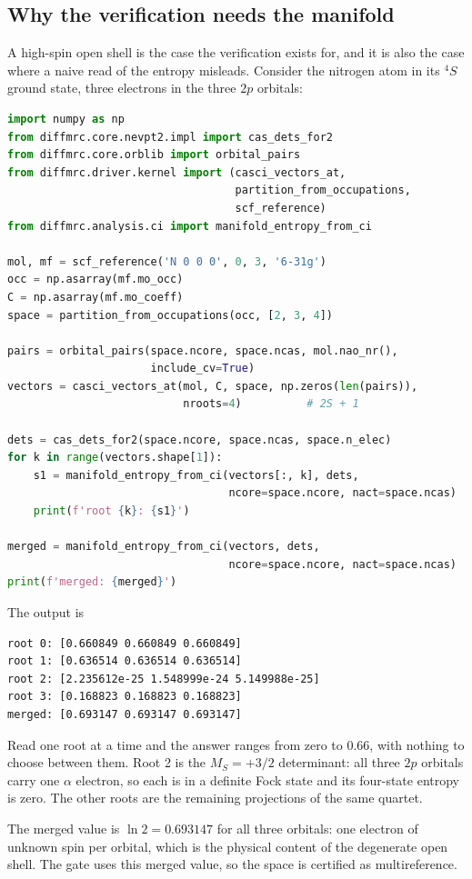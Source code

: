 \subsection{Why the verification needs the manifold}

A high-spin open shell is the case the verification exists for, and it
is also the case where a naive read of the entropy misleads.  Consider
the nitrogen atom in its $^{4}S$ ground state, three electrons in the
three $2p$ orbitals:
\begin{lstlisting}[language=Python]
import numpy as np
from diffmrc.core.nevpt2.impl import cas_dets_for2
from diffmrc.core.orblib import orbital_pairs
from diffmrc.driver.kernel import (casci_vectors_at,
                                   partition_from_occupations,
                                   scf_reference)
from diffmrc.analysis.ci import manifold_entropy_from_ci

mol, mf = scf_reference('N 0 0 0', 0, 3, '6-31g')
occ = np.asarray(mf.mo_occ)
C = np.asarray(mf.mo_coeff)
space = partition_from_occupations(occ, [2, 3, 4])

pairs = orbital_pairs(space.ncore, space.ncas, mol.nao_nr(),
                      include_cv=True)
vectors = casci_vectors_at(mol, C, space, np.zeros(len(pairs)),
                           nroots=4)          # 2S + 1

dets = cas_dets_for2(space.ncore, space.ncas, space.n_elec)
for k in range(vectors.shape[1]):
    s1 = manifold_entropy_from_ci(vectors[:, k], dets,
                                  ncore=space.ncore, nact=space.ncas)
    print(f'root {k}: {s1}')

merged = manifold_entropy_from_ci(vectors, dets,
                                  ncore=space.ncore, nact=space.ncas)
print(f'merged: {merged}')
\end{lstlisting}
The output is
\begin{lstlisting}
root 0: [0.660849 0.660849 0.660849]
root 1: [0.636514 0.636514 0.636514]
root 2: [2.235612e-25 1.548999e-24 5.149988e-25]
root 3: [0.168823 0.168823 0.168823]
merged: [0.693147 0.693147 0.693147]
\end{lstlisting}
Read one root at a time and the answer ranges from zero to $0.66$,
with nothing to choose between them.  Root 2 is the $M_S=+3/2$
determinant: all three $2p$ orbitals carry one $\alpha$ electron, so
each is in a definite Fock state and its four-state entropy is zero.
The other roots are the remaining projections of the same quartet.

The merged value is $\ln 2 = 0.693147$ for all three orbitals: one
electron of unknown spin per orbital, which is the physical content of
the degenerate open shell.  The gate uses this merged value, so the
space is certified as multireference.

